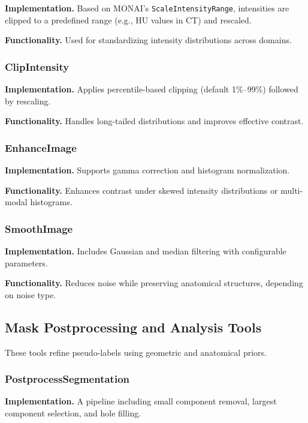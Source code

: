 \documentclass[sigconf]{acmart}
\begin{document}
\textbf{Implementation.}
Based on MONAI's \texttt{ScaleIntensityRange}, intensities are clipped to 
a predefined range (e.g., HU values in CT) and rescaled.

\textbf{Functionality.}
Used for standardizing intensity distributions across domains.

\subsubsection{ClipIntensity}

\textbf{Implementation.}
Applies percentile-based clipping (default 1\%--99\%) followed by rescaling.

\textbf{Functionality.}
Handles long-tailed distributions and improves effective contrast.

\subsubsection{EnhanceImage}

\textbf{Implementation.}
Supports gamma correction and histogram normalization.

\textbf{Functionality.}
Enhances contrast under skewed intensity distributions or multi-modal histograms.

\subsubsection{SmoothImage}

\textbf{Implementation.}
Includes Gaussian and median filtering with configurable parameters.

\textbf{Functionality.}
Reduces noise while preserving anatomical structures, depending on noise type.

\subsection{Mask Postprocessing and Analysis Tools}

These tools refine pseudo-labels using geometric and anatomical priors.

\subsubsection{PostprocessSegmentation}

\textbf{Implementation.}
A pipeline including small component removal, largest component selection, 
and hole filling.
\end{document}
